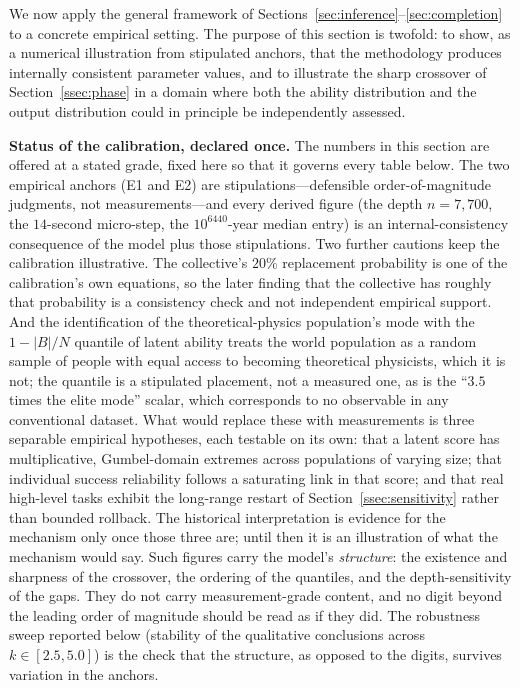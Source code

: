 \documentclass{article}
\begin{document}
We now apply the general framework of
Sections~\ref{sec:inference}--\ref{sec:completion} to a concrete empirical
setting. The purpose of this section is twofold: to show, as a numerical illustration from stipulated anchors, that the methodology produces internally consistent parameter values, and to illustrate the sharp crossover of Section~\ref{ssec:phase} in a domain where both the ability distribution and the output distribution could in principle be independently assessed.

\medskip
\noindent\textbf{Status of the calibration, declared once.}\;
The numbers in this section are offered at a stated grade, fixed here so
that it governs every table below. The two empirical anchors (E1 and E2)
are stipulations---defensible order-of-magnitude judgments, not
measurements---and every derived figure (the depth $n = 7{,}700$, the
$14$-second micro-step, the $10^{6440}$-year median entry) is an
internal-consistency consequence of the model plus those stipulations.
Two further cautions keep the calibration illustrative. The collective's $20\%$ replacement probability is one of the calibration's own equations, so the later finding that the collective has roughly that probability is a consistency check and not independent empirical support. And the identification of the theoretical-physics population's mode with the $1 - |B|/N$ quantile of latent ability treats the world population as a random sample of people with equal access to becoming theoretical physicists, which it is not; the quantile is a stipulated placement, not a measured one, as is the ``$3.5$ times the elite mode'' scalar, which corresponds to no observable in any conventional dataset. What would replace these with measurements is three separable empirical hypotheses, each testable on its own: that a latent score has multiplicative, Gumbel-domain extremes across populations of varying size; that individual success reliability follows a saturating link in that score; and that real high-level tasks exhibit the long-range restart of Section~\ref{ssec:sensitivity} rather than bounded rollback. The historical interpretation is evidence for the mechanism only once those three are; until then it is an illustration of what the mechanism would say.
Such figures carry the model's \emph{structure}: the existence and
sharpness of the crossover, the ordering of the quantiles, and
the depth-sensitivity of the gaps. They do not carry measurement-grade
content, and no digit beyond the leading order of magnitude should be
read as if they did. The robustness sweep reported below (stability of
the qualitative conclusions across $k \in [2.5, 5.0]$) is the check that
the structure, as opposed to the digits, survives variation in the
anchors.
\end{document}
